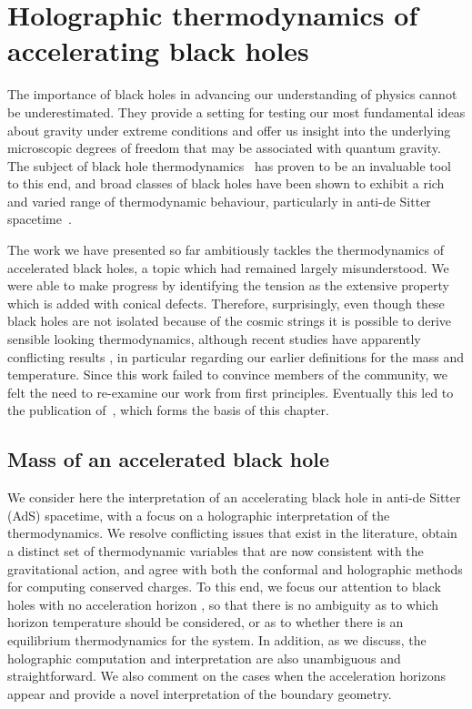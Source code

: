 \documentclass[
twoside,
openright,
frontopenright,
]{dmathesis}
\begin{document}
\chapter{Holographic thermodynamics of accelerating black holes}
\label{cha:holoTD} 

The importance of black holes in advancing our understanding of physics cannot
be underestimated.  They provide a setting for testing our most fundamental
ideas about gravity under extreme conditions and offer us insight into the
underlying microscopic degrees of freedom that may be associated with quantum
gravity.  The subject of black hole thermodynamics~\cite{Bekenstein:1973ur,
  Bekenstein:1974ax,Hawking:1974sw} has proven to be an invaluable tool to this
end, and broad classes of black holes have been shown to exhibit a rich and
varied range of thermodynamic behaviour, particularly in anti-de Sitter
spacetime~\cite{Kubiznak:2016qmn}.

The work we have presented so far ambitiously tackles the thermodynamics of
accelerated black holes, a topic which had remained largely misunderstood. We
were able to make progress by identifying the tension as the extensive property
which is added with conical defects. Therefore, surprisingly, even though these
black holes are not isolated because of the cosmic strings it is possible to
derive sensible looking thermodynamics, although recent studies have apparently
conflicting results
\cite{Appels:2016uha,Appels:2017xoe,Gregory:2017ogk,Astorino:2016ybm}, in
particular regarding our earlier definitions for the mass and temperature. Since
this work failed to convince members of the community, we felt the need to
re-examine our work from first principles. Eventually this led to the
publication of~\cite{Anabalon:2018ydc}, which forms the basis of this chapter.

\section{Mass of an accelerated black hole}
\label{sec:mass-an-accelerated}

We consider here the interpretation of an accelerating black hole in anti-de
Sitter (AdS) spacetime, with a focus on a holographic interpretation of the
thermodynamics. We resolve conflicting issues that exist in the literature,
obtain a distinct set of thermodynamic variables that are now consistent with
the gravitational action, and agree with both the conformal and holographic
methods for computing conserved charges. To this end, we focus our attention to
black holes with no acceleration horizon \cite{Podolsky:2002nk}, so that there
is no ambiguity as to which horizon temperature should be considered, or as to
whether there is an equilibrium thermodynamics for the system. In addition, as
we discuss, the holographic computation and interpretation are also unambiguous
and straightforward. We also comment on the cases when the acceleration horizons
appear and provide a novel interpretation of the boundary geometry.
\end{document}
